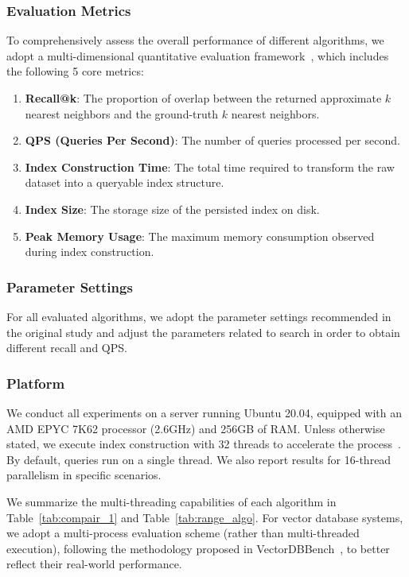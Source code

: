 \documentclass[sigconf, nonacm]{acmart}
\begin{document}
	\subsubsection{Evaluation Metrics}
	
	To comprehensively assess the overall performance of different algorithms, we adopt a multi-dimensional quantitative evaluation framework~\cite{compare}, which includes the following 5 core metrics:
	
	\begin{enumerate}
		
		\item \textbf{Recall@k}: The proportion of overlap between the returned approximate $k$ nearest neighbors and the ground-truth $k$ nearest neighbors.
		\item \textbf{QPS (Queries Per Second)}: The number of queries processed per second.
		\item \textbf{Index Construction Time}: The total time required to transform the raw dataset into a queryable index structure.
		\item \textbf{Index Size}: The storage size of the persisted index on disk.
		\item \textbf{Peak Memory Usage}: The maximum memory consumption observed during index construction.
	\end{enumerate}
	
	\subsubsection{Parameter Settings}
	
	For all evaluated algorithms, we adopt the parameter settings recommended in the original study and adjust the parameters related to search in order to obtain different recall and QPS.
	
	
	
	\subsubsection{Platform}
	
	
	We conduct all experiments on a server running Ubuntu 20.04, equipped with an AMD EPYC 7K62 processor (2.6GHz) and 256GB of RAM. Unless otherwise stated, we execute index construction with 32 threads to accelerate the process~\cite{benchmarkindex}. By default, queries run on a single thread. We also report results for 16-thread parallelism in specific scenarios.
	
	We summarize the multi-threading capabilities of each algorithm in Table~\ref{tab:compair_1} and Table~\ref{tab:range_algo}. For vector database systems, we adopt a multi-process evaluation scheme (rather than multi-threaded execution), following the methodology proposed in VectorDBBench~\cite{VectorDBBench}, to better reflect their real-world performance.
	
\end{document}
